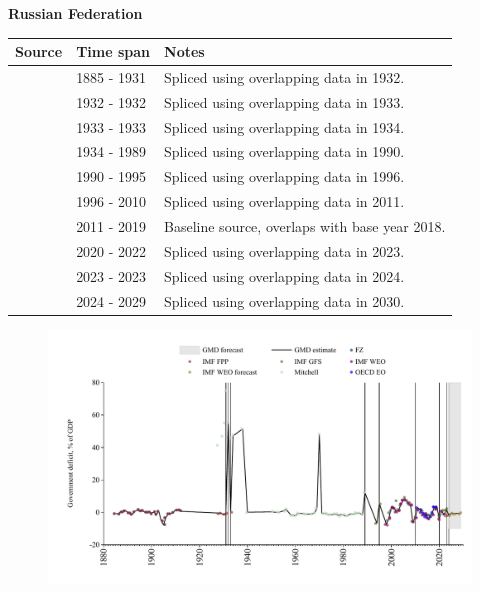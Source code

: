 \documentclass[12pt,a4paper,landscape]{article}
\begin{document}
\begin{adjustbox}{max totalsize={\paperwidth}{\paperheight},center}
\begin{minipage}[t][\textheight][t]{\textwidth}
\vspace*{0.5cm}
{}
\begin{center}
{\Large\bfseries Russian Federation}
\end{center}
\vspace{0.5cm}
\begin{table}[H]
\centering
\small
\begin{tabular}{|l|l|l|}
\hline
\textbf{Source} & \textbf{Time span} & \textbf{Notes} \\
\hline
\rowcolor{white}\cite{IMF_FPP}& 1885 - 1931 &Spliced using overlapping data in 1932.\\
\rowcolor{lightgray}\cite{Mitchell}& 1932 - 1932 &Spliced using overlapping data in 1933.\\
\rowcolor{white}\cite{IMF_FPP}& 1933 - 1933 &Spliced using overlapping data in 1934.\\
\rowcolor{lightgray}\cite{Mitchell}& 1934 - 1989 &Spliced using overlapping data in 1990.\\
\rowcolor{white}\cite{IMF_GFS}& 1990 - 1995 &Spliced using overlapping data in 1996.\\
\rowcolor{lightgray}\cite{IMF_WEO}& 1996 - 2010 &Spliced using overlapping data in 2011.\\
\rowcolor{white}\cite{OECD_EO}& 2011 - 2019 &Baseline source, overlaps with base year 2018.\\
\rowcolor{lightgray}\cite{IMF_WEO}& 2020 - 2022 &Spliced using overlapping data in 2023.\\
\rowcolor{white}\cite{IMF_GFS}& 2023 - 2023 &Spliced using overlapping data in 2024.\\
\rowcolor{lightgray}\cite{IMF_WEO_forecast}& 2024 - 2029 &Spliced using overlapping data in 2030.\\
\hline
\end{tabular}
\end{table}
\begin{figure}[H]
\centering
\includegraphics[width=\textwidth,height=0.6\textheight,keepaspectratio]{graphs/RUS_govdef_GDP.pdf}
\end{figure}
\end{minipage}
\end{adjustbox}
\end{document}

